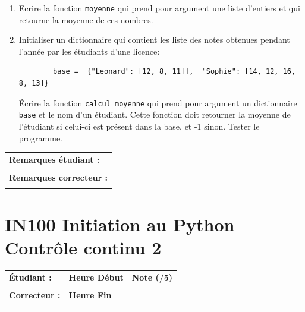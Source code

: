 \documentclass[a4paper,11pt]{article}
\begin{document}
\begin{enumerate}
		
		\item Ecrire la fonction \texttt{moyenne} qui prend pour argument une liste d'entiers et qui retourne la moyenne de ces nombres.
		\item Initialiser un dictionnaire qui contient les liste des notes obtenues pendant l'année par les étudiants d'une licence: 
		\begin{verbatim}
		base =  {"Leonard": [12, 8, 11]],  "Sophie": [14, 12, 16, 8, 13]}
		\end{verbatim}
		
		\noindent \'Ecrire la fonction \texttt{calcul\_moyenne} qui prend pour argument un dictionnaire \texttt{base}   et le nom d'un étudiant. Cette fonction doit retourner la moyenne de l'étudiant si celui-ci est présent dans la base, et -1 sinon.
		Tester le programme.
		
	\end{enumerate}

\vspace{1 cm}
\begin{table}[h!]
\centering
\renewcommand{\arraystretch}{1.4} %
\begin{tabular}{|p{15cm}|}
\hline
\textbf{Remarques étudiant :}    \\
 \\
\hline
\textbf{Remarques correcteur :}  \\
 \\
\hline
\end{tabular}
\end{table}




\newpage

\section*{\center IN100 Initiation au Python\\
Contrôle continu 2}

\vspace{0.3 cm}

\begin{table}[h!]
\centering
\renewcommand{\arraystretch}{1.4} %
\begin{tabular}{|p{10cm}|p{3cm}|p{2cm}|}
\hline
\textbf{Étudiant :} & \textbf{Heure Début }  & \textbf{Note (/5) }  \\
& & \\
\hline
\textbf{Correcteur :} & \textbf{Heure Fin } & \\
& & \\
\hline

\hline
\end{tabular}
\end{table}
\vspace{0.4 cm}
\end{document}

